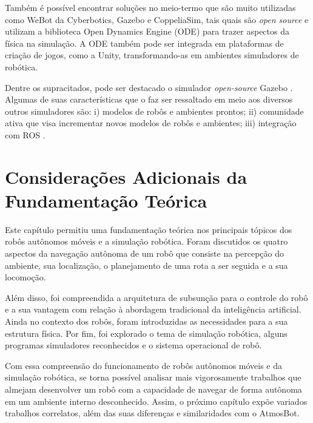Também é possível encontrar soluções no meio-termo que são muito utilizadas como WeBot da Cyberbotics, Gazebo e CoppeliaSim, tais quais são \textit{open source} e utilizam a biblioteca Open Dynamics Engine (ODE) para trazer aspectos da física na simulação.  A ODE também pode ser integrada em plataformas de criação de jogos, como a Unity, transformando-as em ambientes simuladores de robótica. 

Dentre os supracitados, pode ser destacado o simulador \textit{open-source} Gazebo \cite{gazeboDesigns:2004}. Algumas de suas características que o faz ser ressaltado em meio aos diversos outros simuladores são: i) modelos de robôs e ambientes prontos; ii) comunidade ativa que visa incrementar novos modelos de robôs e ambientes; iii) integração com ROS \cite{gazeboDesigns:2004, pickSimulatorFarley:2022}.

\section{Considerações Adicionais da Fundamentação Teórica}

Este capítulo permitiu uma fundamentação teórica nos principais tópicos dos robôs autônomos móveis e a simulação robótica. Foram discutidos os quatro aspectos da navegação autônoma de um robô que consiste na percepção do ambiente, sua localização, o planejamento de uma rota a ser seguida e a sua locomoção. 

Além disso, foi compreendida a arquitetura de subsunção para o controle do robô e a sua vantagem com relação à abordagem tradicional da inteligência artificial. Ainda no contexto dos robôs, foram introduzidas as necessidades para a sua estrutura física.  Por fim, foi explorado o tema de simulação robótica, alguns programas simuladores reconhecidos e o sistema operacional de robô. 

Com essa compreensão do funcionamento de robôs autônomos móveis e da simulação robótica, se torna possível analisar mais vigorosamente trabalhos que almejam desenvolver um robô com a capacidade de navegar de forma autônoma em um ambiente interno desconhecido. Assim, o próximo capítulo expõe variados trabalhos correlatos, além das suas diferenças e similaridades com o AtmosBot.


